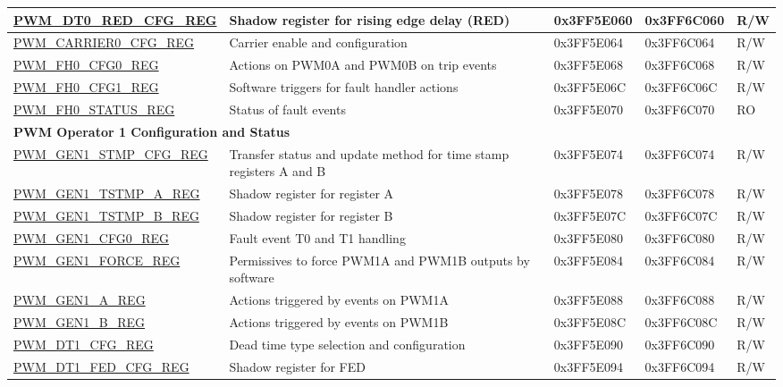 \begin{longtable}{ | p{5.5cm} | p{5.7cm} | p{2cm} | p{2cm} | p{0.8cm} | }
\hyperref[regdesc:PWMDT0REDCFGREG]{PWM\_DT0\_RED\_CFG\_REG} & Shadow register for rising edge delay (RED) & 0x3FF5E060 & 0x3FF6C060 & R/W \\ \hline
\hyperref[regdesc:PWMCARRIER0CFGREG]{PWM\_CARRIER0\_CFG\_REG} & Carrier enable and configuration & 0x3FF5E064 & 0x3FF6C064 & R/W \\ \hline
\hyperref[regdesc:PWMFH0CFG0REG]{PWM\_FH0\_CFG0\_REG} & Actions on PWM0A and PWM0B on trip events & 0x3FF5E068 & 0x3FF6C068 & R/W \\ \hline
\hyperref[regdesc:PWMFH0CFG1REG]{PWM\_FH0\_CFG1\_REG} & Software triggers for fault handler actions & 0x3FF5E06C & 0x3FF6C06C & R/W \\ \hline
\hyperref[regdesc:PWMFH0STATUSREG]{PWM\_FH0\_STATUS\_REG} & Status of fault events & 0x3FF5E070 & 0x3FF6C070 & RO \\ \hline
\multicolumn{5}{|l|}{\textbf{PWM Operator 1 Configuration and Status}} \\ \hline
\hyperref[regdesc:PWMGEN1STMPCFGREG]{PWM\_GEN1\_STMP\_CFG\_REG} & Transfer status and update method for time stamp registers A and B & 0x3FF5E074 & 0x3FF6C074 & R/W \\ \hline
\hyperref[regdesc:PWMGEN1TSTMPAREG]{PWM\_GEN1\_TSTMP\_A\_REG} & Shadow register for register A & 0x3FF5E078 & 0x3FF6C078 & R/W \\ \hline
\hyperref[regdesc:PWMGEN1TSTMPBREG]{PWM\_GEN1\_TSTMP\_B\_REG} & Shadow register for register B & 0x3FF5E07C & 0x3FF6C07C & R/W \\ \hline
\hyperref[regdesc:PWMGEN1CFG0REG]{PWM\_GEN1\_CFG0\_REG} & Fault event T0 and T1 handling & 0x3FF5E080 & 0x3FF6C080 & R/W \\ \hline
\hyperref[regdesc:PWMGEN1FORCEREG]{PWM\_GEN1\_FORCE\_REG} & Permissives to force PWM1A and PWM1B outputs by software & 0x3FF5E084 & 0x3FF6C084 & R/W \\ \hline
\hyperref[regdesc:PWMGEN1AREG]{PWM\_GEN1\_A\_REG} & Actions triggered by events on PWM1A & 0x3FF5E088 & 0x3FF6C088 & R/W \\ \hline
\hyperref[regdesc:PWMGEN1BREG]{PWM\_GEN1\_B\_REG} & Actions triggered by events on PWM1B & 0x3FF5E08C & 0x3FF6C08C & R/W \\ \hline
\hyperref[regdesc:PWMDT1CFGREG]{PWM\_DT1\_CFG\_REG} & Dead time type selection and configuration & 0x3FF5E090 & 0x3FF6C090 & R/W \\ \hline
\hyperref[regdesc:PWMDT1FEDCFGREG]{PWM\_DT1\_FED\_CFG\_REG} & Shadow register for FED & 0x3FF5E094 & 0x3FF6C094 & R/W \\ \hline

\end{longtable}

